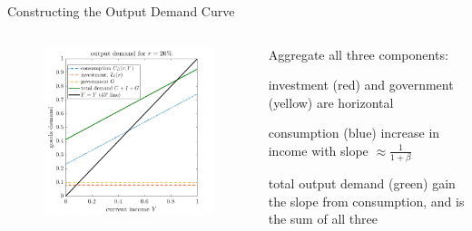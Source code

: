 \documentclass[11pt,aspectratio=169,usenames,dvipsnames]{beamer}
\let\tempone\itemize
\let\temptwo\enditemize
\renewenvironment{itemize}{\tempone\addtolength{\itemsep}{\fill}}{\temptwo}
\begin{document}
\begin{frame}{Constructing the Output Demand Curve}
\label{slide:Constructing_the_Output_Demand_Curve}
    \begin{columns}
        \begin{column}{0.5\textwidth}
            \begin{figure}
                \includegraphics[width=\textwidth]{./figures/OutputDemand.png}
            \end{figure}


        \end{column}
        \begin{column}{0.5\textwidth}
            Aggregate all three components:
            \begin{itemize}
                \item investment (red) and government (yellow) are horizontal
                \item consumption (blue) increase in income with slope $ \approx \frac{1}{1+\beta} $
                \item total output demand (green) gain the slope from consumption, and is the sum of all three
            \end{itemize}
        \end{column}
    \end{columns}
\end{frame}
\end{document}
